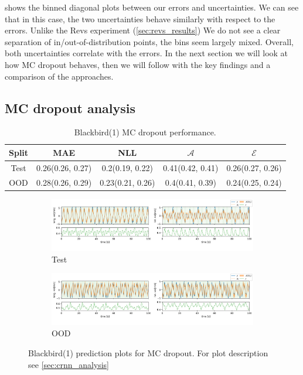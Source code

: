  shows the binned diagonal plots between our errors and uncertainties. We can see that in this case, the two uncertainties behave similarly with respect to the errors. Unlike the Revs experiment (\cref{sec:revs_results}) We do not see a clear separation of in/out-of-distribution points, the bins seem largely mixed. Overall, both uncertainties correlate with the errors.  
In the next section we will look at how MC dropout behaves, then we will follow with the key findings and a comparison of the approaches.


\clearpage
\subsection{MC dropout analysis}

\begin{table}[ht]
\centering
    \begin{tabular}{c  c  c   c  c }  
        \toprule
        Split & MAE & NLL & $\mathcal{A}$ & $\mathcal{E}$\\
        \midrule
        Test & 0.26(0.26, 0.27) & 0.2(0.19, 0.22) & 0.41(0.42, 0.41) &  0.26(0.27, 0.26)\\
        OOD  &  0.28(0.26, 0.29) &  0.23(0.21, 0.26) & 0.4(0.41, 0.39)&  0.24(0.25, 0.24)\\
        \midrule
    \end{tabular}
    \caption{Blackbird(1) MC dropout performance.}
    \label{tbl:bb1_dropout}
\end{table}

\begin{figure}[ht]
  \centering
  
  \begin{subfigure}[b]{\textwidth}
    \includegraphics[width=\textwidth]{Experiments/figs/bb1_dropout_test.png}
    \caption{Test}
  \end{subfigure}
  
  \begin{subfigure}[b]{\textwidth}
    \includegraphics[width=\textwidth]{Experiments/figs/bb1_dropout_ood.png}
    \caption{OOD}
  \end{subfigure}
  
  \caption[Blackbird(1) prediction plots for MC dropout]{Blackbird(1) prediction plots for MC dropout. For plot description see \cref{sec:crnn_analysis}}
  \label{fig:bb1_dropout_run}
\end{figure}

